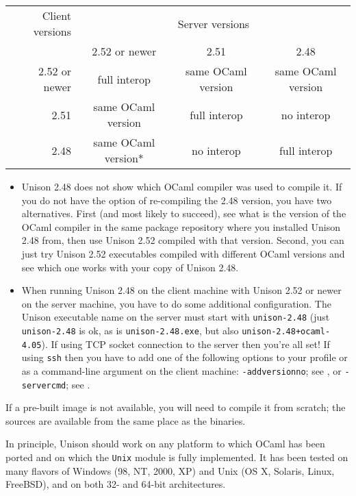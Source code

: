 \documentclass{article}
\begin{document}
\vspace{1em}
\begin{tabular}{r||c|c|c}
  Client versions & \multicolumn{3}{c}{Server versions} \\
  & 2.52 or newer & 2.51  & 2.48 \\
  \hline \hline
  2.52 or newer & full interop & same OCaml version & same OCaml version \\
  \hline
  2.51 & same OCaml version & full interop & no interop \\
  \hline
  2.48 & same OCaml version* & no interop & full interop \\
\end{tabular}
\vspace{2em}

\begin{itemize}
\item Unison 2.48 does not show which OCaml compiler was used to compile it.
If you do not have the option of re-compiling the 2.48 version, you have
two alternatives.  First (and most likely to succeed), see what is the version
of the OCaml compiler in the same package repository where you installed
Unison 2.48 from, then use Unison 2.52 compiled with that version.
Second, you can just try Unison 2.52 executables compiled with different
OCaml versions and see which one works with your copy of Unison 2.48.
\item When running Unison 2.48 on the client machine with Unison 2.52 or
newer on the server machine, you have to do some additional configuration.
The Unison executable name on the server must start with \verb|unison-2.48|
(just \verb|unison-2.48| is ok, as is \verb|unison-2.48.exe|, but also
\verb|unison-2.48+ocaml-4.05|).  If using TCP socket connection to the
server then you're all set!  If using {\tt ssh} then you have to add one
of the following options to your profile or as a command-line argument
on the client machine: \verb|-addversionno|; see
, or \verb|-servercmd|; see
.
\end{itemize}



If a pre-built image is not available, you will need to compile it from
scratch; the sources are available from the same place as the binaries.

In principle, Unison should work on any platform to which OCaml has been
ported and on which the \verb|Unix| module is fully implemented.  It has
been tested on many flavors of Windows (98, NT, 2000, XP) and Unix (OS X,
Solaris, Linux, FreeBSD), and on both 32- and 64-bit architectures.
\end{document}
